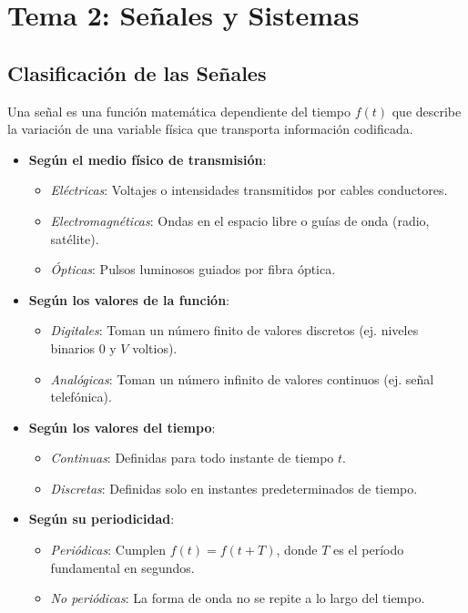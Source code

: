 \chapter{Tema 2: Señales y Sistemas}

\section{Clasificación de las Señales}

\begin{tcolorbox}[cajaResumen, title={Conceptos Fundamentales: Clasificación}]
Una señal es una función matemática dependiente del tiempo $f(t)$ que describe la variación de una variable física que transporta información codificada.
\begin{itemize}[leftmargin=*]
    \item \textbf{Según el medio físico de transmisión}:
    \begin{itemize}
        \item \textit{Eléctricas}: Voltajes o intensidades transmitidos por cables conductores.
        \item \textit{Electromagnéticas}: Ondas en el espacio libre o guías de onda (radio, satélite).
        \item \textit{Ópticas}: Pulsos luminosos guiados por fibra óptica.
    \end{itemize}
    \item \textbf{Según los valores de la función}:
    \begin{itemize}
        \item \textit{Digitales}: Toman un número finito de valores discretos (ej. niveles binarios $0$ y $V$ voltios).
        \item \textit{Analógicas}: Toman un número infinito de valores continuos (ej. señal telefónica).
    \end{itemize}
    \item \textbf{Según los valores del tiempo}:
    \begin{itemize}
        \item \textit{Continuas}: Definidas para todo instante de tiempo $t$.
        \item \textit{Discretas}: Definidas solo en instantes predeterminados de tiempo.
    \end{itemize}
    \item \textbf{Según su periodicidad}:
    \begin{itemize}
        \item \textit{Periódicas}: Cumplen $f(t) = f(t + T)$, donde $T$ es el período fundamental en segundos.
        \item \textit{No periódicas}: La forma de onda no se repite a lo largo del tiempo.
    \end{itemize}
\end{itemize}
\end{tcolorbox}

